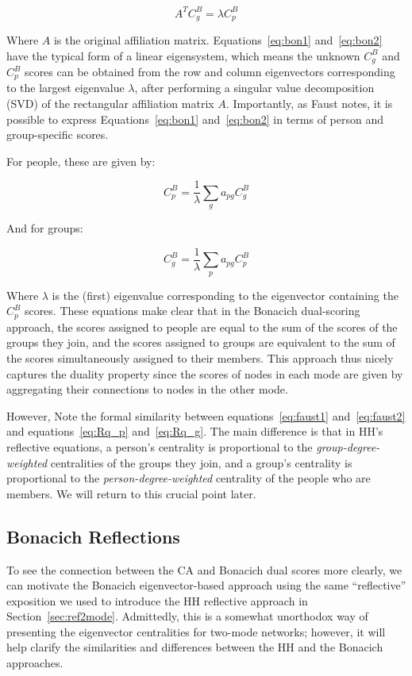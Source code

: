 \documentclass[a4paper,fleqn]{cas-sc}
\begin{document}
\begin{equation}
    A^TC^B_g = \lambda C^B_p 
    \label{eq:bon2}
\end{equation}

Where $A$ is the original affiliation matrix. Equations~\ref{eq:bon1} and~\ref{eq:bon2} have the typical form of a linear eigensystem, which means the unknown $C^B_g$ and $C^B_p$ scores can be obtained from the row and column eigenvectors corresponding to the largest eigenvalue $\lambda$, after performing a singular value decomposition (SVD) of the rectangular affiliation matrix $A$. Importantly, as Faust \citeyearpar[170]{faust1997centrality} notes, it is possible to express Equations~\ref{eq:bon1} and~\ref{eq:bon2} in terms of person and group-specific scores. 

For people, these are given by: 

\begin{equation}
    C^B_p = \frac{1}{\lambda}\sum_{g}a_{pg}C^B_g
    \label{eq:faust1}
\end{equation}

And for groups:

\begin{equation}
    C^B_g = \frac{1}{\lambda}\sum_{p}a_{pg}C^B_p
    \label{eq:faust2}
\end{equation}

Where $\lambda$ is the (first) eigenvalue corresponding to the eigenvector containing the $C^B_p$ scores. These equations make clear that in the Bonacich dual-scoring approach, the scores assigned to people are equal to the sum of the scores of the groups they join, and the scores assigned to groups are equivalent to the sum of the scores simultaneously assigned to their members. This approach thus nicely captures the duality property since the scores of nodes in each mode are given by aggregating their connections to nodes in the other mode. 

However, Note the formal similarity between equations~\ref{eq:faust1} and~\ref{eq:faust2} and equations~\ref{eq:Rq_p} and~\ref{eq:Rq_g}. The main difference is that in HH's reflective equations, a person's centrality is proportional to the \textit{group-degree-weighted} centralities of the groups they join, and a group's centrality is proportional to the \textit{person-degree-weighted} centrality of the people who are members. We will return to this crucial point later.

\subsection{Bonacich Reflections} \label{subsec:bonref}
To see the connection between the CA and Bonacich dual scores more clearly, we can motivate the Bonacich eigenvector-based approach using the same ``reflective'' exposition we used to introduce the HH reflective approach in Section~\ref{sec:ref2mode}. Admittedly, this is a somewhat unorthodox way of presenting the eigenvector centralities for two-mode networks; however, it will help clarify the similarities and differences between the HH and the Bonacich approaches. 
\end{document}
